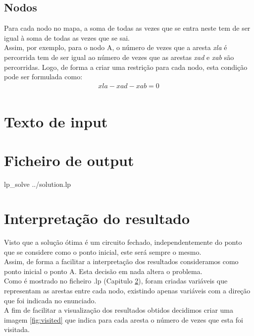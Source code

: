 \documentclass[a4paper]{report}
\begin{document}
\section{Nodos}
Para cada nodo no mapa, a soma de todas as vezes que se entra neste
tem de ser igual à soma de todas as vezes que se sai.\\
Assim, por exemplo, para o nodo A, o número de vezes que a aresta
\textit{xla} é percorrida tem de ser igual ao número de vezes que
as arestas \textit{xad} e \textit{xab} são percorridas.
Logo, de forma a criar uma restrição para cada nodo, esta condição
pode ser formulada como:\\
\begin{multline}
xla- xad - xab = 0 \\
\end{multline}

\chapter{Texto de input}
\label{input}


\chapter{Ficheiro de output}
\label{output}
\bash[stdout]
lp_solve ../solution.lp
\END

\chapter{Interpretação do resultado}

Visto que a solução ótima é um circuito fechado, independentemente do ponto
que se considere como o ponto inicial, este será sempre o mesmo. \\
Assim, de forma a facilitar a interpretação dos resultados consideramos como ponto
inicial o ponto A. Esta decisão em nada altera o problema.\\
Como é mostrado no ficheiro .lp (Capitulo \ref{input}), foram criadas variáveis
que representam as arestas entre cada nodo, existindo apenas variáveis com a direção 
que foi indicada no enunciado. \\
A fim de facilitar a visualização dos resultados obtidos decidimos criar uma
imagem \ref{fig:visited} que indica para cada aresta o número de vezes que esta
foi visitada.
\end{document}
